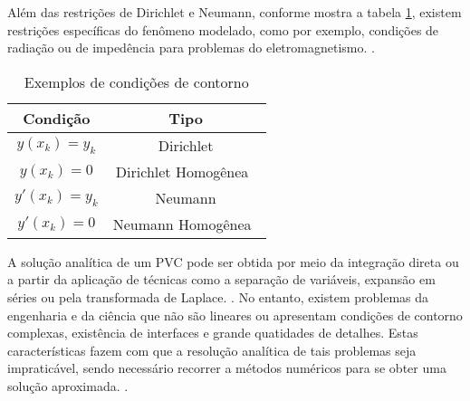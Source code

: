 Além das restrições de Dirichlet e Neumann, conforme mostra a tabela \ref{tab:cond}, existem restrições específicas do fenômeno modelado, como por exemplo, condições de radiação ou de impedência para problemas do eletromagnetismo. \citep[p. 20]{jin}. 


\begin{table}	
	\centering
	\begin{tabular}{|c|c|}	
		\hline
		\textbf{Condição} 
		& \textbf{Tipo} \\	
		\hline
		$y(x_k) = y_k $ 
		& Dirichlet \\
		\hline
		$y(x_k) = 0$
		& Dirichlet Homogênea\  \\
		\hline
		$y'(x_k) = y_k$
		& Neumann \\
		\hline
		$y'(x_k) = 0$
		& Neumann Homogênea\  \\
		\hline
	\end{tabular}
	\caption{Exemplos de condições de contorno}
	\label{tab:cond}
\end{table}


A solução analítica de um PVC pode ser obtida por meio da integração direta ou a partir da aplicação de técnicas como a separação de variáveis, expansão em séries ou pela transformada de Laplace. \citep[p. 31, 191, 239]{boyce_diprima} \citep[p. 59, 263, 355]{powers}.
No entanto, existem problemas da engenharia e da ciência que não são lineares ou apresentam  condições de contorno complexas, existência de interfaces e grande quatidades de detalhes.  Estas características fazem com que a resolução analítica de tais problemas seja impraticável, sendo necessário recorrer a métodos numéricos para se obter uma solução aproximada. \citep[p. 447]{boyce_diprima}  \citep[p.397]{powers}.


